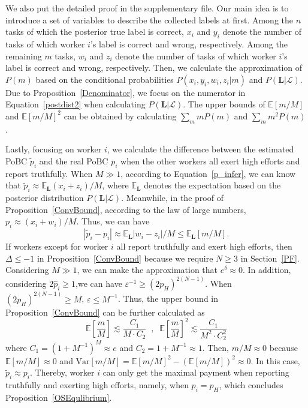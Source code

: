 We also put the detailed proof in the supplementary file.
Our main idea is to introduce a set of variables to describe the collected labels at first.
Among the $n$ tasks of which the posterior true label is correct, $x_i$ and $y_i$ denote the number of tasks of which worker $i$'s label is correct and wrong, respectively.
Among the remaining $m$ tasks, $w_i$ and $z_i$ denote the number of tasks of which worker $i$'s label is correct and wrong, respectively.
Then, we calculate the approximation of $P(m)$ based on the conditional probabilities $P(x_i,y_i,w_i, z_i|m)$ and $P(\bm{L}|\mathcal{L})$.
Due to Proposition~\ref{Denominator}, we focus on the numerator in Equation~\ref{postdist2} when calculating $P(\bm{L}|\mathcal{L})$.
The upper bounds of $\mathbb{E}[m/M]$ and $\mathbb{E}[m/M]^2$ can be obtained by calculating $\sum_{m}m P(m)$ and $\sum_{m} m^2P(m)$.

Lastly, focusing on worker $i$, we calculate the difference between the estimated PoBC $\tilde{p}_i$ and the real PoBC $p_i$ when the other workers all exert high efforts and report truthfully.
When $M\gg 1$, according to Equation~\ref{p_infer}, we can know that $\tilde{p}_i\approx \mathbb{E}_{\bm{L}}(x_i+z_i)/M$, where $\mathbb{E}_{\bm{L}}$ denotes the expectation based on the posterior distribution $P(\bm{L}|\mathcal{L})$. Meanwhile, in the proof of Proposition~\ref{ConvBound}, according to the law of large numbers, $p_i\approx (x_i+w_i)/M$. Thus, we can have
\begin{equation}
|\tilde{p}_i-p_i|\approx \mathbb{E}_{\bm{L}}|w_i-z_i|/M\leq \mathbb{E}_{\bm{L}}\left[m/M\right].
\end{equation}
If workers except for worker $i$ all report truthfully and exert high efforts, then $\Delta \leq -1$ in Proposition~\ref{ConvBound} because we require $N\geq 3$ in Section~\ref{PF}.
Considering $M\gg 1$, we can make the approximation that $e^{\delta}\approx 0$.
In addition, considering $2\hat{p}_i\geq 1$,we can have $\varepsilon^{-1}\geq (2p_H)^{2(N-1)}$.
When $(2p_H)^{2(N-1)} \geq M$, $\varepsilon\leq M^{-1}$.
Thus, the upper bound in Proposition~\ref{ConvBound} can be further calculated as
\begin{equation}
\mathbb{E}\left[\frac{m}{M}\right]\lesssim \frac{C_{1}}{M\cdot C_2}\;\;, \;\;\mathbb{E}\left[\frac{m}{M}\right]^2\lesssim \frac{C_{1}}{M^2\cdot C_2^2}
\end{equation}
where $C_{1}=(1+M^{-1})^{M}\approx e$ and $C_{2}=1+M^{-1}\approx 1$.
Then, $m/M\approx 0$ because $\mathbb{E}[m/M]\approx 0$ and $\mathrm{Var}[m/M]=\mathbb{E}[m/M]^2-(\mathbb{E}[m/M])^2 \approx 0$.
In this case, $\tilde{p}_i\approx p_i$.
Thereby, worker $i$ can only get the maximal payment when reporting truthfully and exerting high efforts, namely, when $p_i=p_H$, which concludes Proposition~\ref{OSEqulibrium}.

